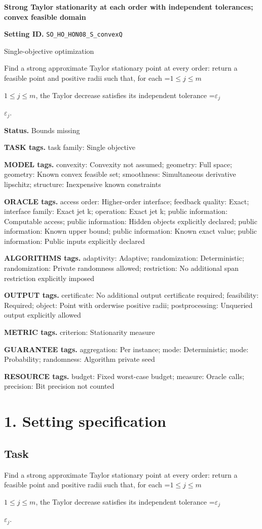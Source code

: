 \documentclass[10pt,a4paper]{article}
\newcommand{\AtlasMath}[1]{\par\begingroup\centering\setbox0=\hbox{$\displaystyle #1$}\ifdim\wd0>1.4\linewidth\typeout{ATLAS WIDE FORMULA: \the\wd0}\fi\ifdim\wd0>\linewidth\resizebox{\linewidth}{!}{\box0}\else\box0\fi\par\endgroup}
\newcommand{\AtlasInlineMath}[1]{\begingroup\setbox0=\hbox{$#1$}\ifdim\wd0>.4\linewidth\endgroup\AtlasMath{#1}\else\endgroup$#1$\fi}
\begin{document}
\raggedright

{\LARGE\bfseries\sffamily\color{AtlasNavy} Strong Taylor stationarity at each order with independent tolerances; convex feasible domain\par}\vspace{5pt}
\textbf{Setting ID.} \texttt{SO\_\allowbreak{}HO\_\allowbreak{}HON08\_\allowbreak{}S\_\allowbreak{}convexQ}

Single-objective optimization

Find a strong approximate Taylor stationary point at every order: return a feasible point and positive radii such that, for each \AtlasInlineMath{1\le j\le m}, the Taylor decrease satisfies its independent tolerance \AtlasInlineMath{\varepsilon_j}.

\textbf{Status.} Bounds missing

\textbf{TASK tags.} task family: Single objective

\textbf{MODEL tags.} convexity: Convexity not assumed; geometry: Full space; geometry: Known convex feasible set; smoothness: Simultaneous derivative lipschitz; structure: Inexpensive known constraints

\textbf{ORACLE tags.} access order: Higher-order interface; feedback quality: Exact; interface family: Exact jet k; operation: Exact jet k; public information: Computable access; public information: Hidden objects explicitly declared; public information: Known upper bound; public information: Known exact value; public information: Public inputs explicitly declared

\textbf{ALGORITHMS tags.} adaptivity: Adaptive; randomization: Deterministic; randomization: Private randomness allowed; restriction: No additional span restriction explicitly imposed

\textbf{OUTPUT tags.} certificate: No additional output certificate required; feasibility: Required; object: Point with orderwise positive radii; postprocessing: Unqueried output explicitly allowed

\textbf{METRIC tags.} criterion: Stationarity measure

\textbf{GUARANTEE tags.} aggregation: Per instance; mode: Deterministic; mode: Probability; randomness: Algorithm private seed

\textbf{RESOURCE tags.} budget: Fixed worst-case budget; measure: Oracle calls; precision: Bit precision not counted

\section{1. Setting specification}
\subsection{Task}
Find a strong approximate Taylor stationary point at every order: return a feasible point and positive radii such that, for each \AtlasInlineMath{1\le j\le m}, the Taylor decrease satisfies its independent tolerance \AtlasInlineMath{\varepsilon_j}.
\end{document}
